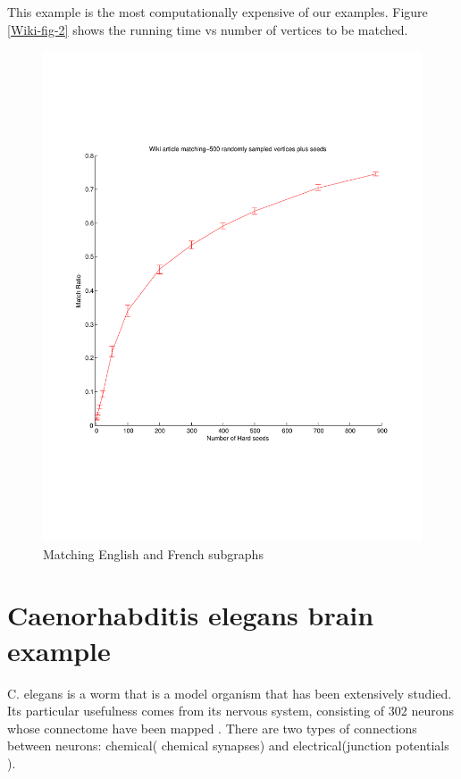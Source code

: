 \documentclass[12pt]{article}
\begin{document}
This example is the most computationally expensive of our examples. Figure \ref{Wiki-fig-2} shows the running time vs number of vertices to be matched.

\begin{figure}
\centering
\includegraphics[scale=0.8]{wiki}
\caption{Matching English and French subgraphs \label{Wiki-fig-1}  }
\end{figure}

\section{Caenorhabditis elegans brain example \label{celegans}}
C. elegans is a worm that is a model organism that has been extensively studied. Its  particular usefulness comes from its nervous system, consisting of 302 neurons whose connectome have been  mapped \cite{}. There are two types  of  connections between neurons: chemical( chemical synapses) and electrical(junction potentials ). 
\end{document}
